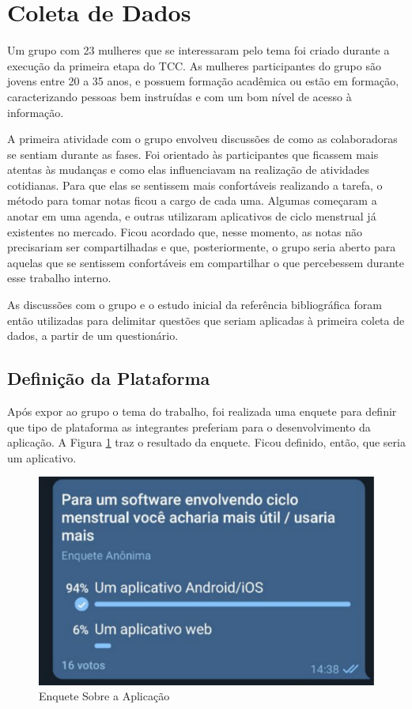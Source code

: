 \section{Coleta de Dados}
\label{coletadados}

Um grupo com 23 mulheres que se interessaram pelo tema foi criado durante a execução da primeira etapa do TCC. 
As mulheres participantes do grupo são jovens entre 20 a 35 anos, e possuem 
formação acadêmica ou estão em formação, caracterizando pessoas bem instruídas e com um bom 
nível de acesso à informação.

A primeira atividade com o grupo envolveu discussões de como as colaboradoras se sentiam durante as fases. Foi orientado
às participantes que ficassem mais atentas às mudanças e como elas influenciavam na realização de 
atividades cotidianas. Para que elas se sentissem mais confortáveis realizando a tarefa, o método para tomar notas ficou a cargo de cada uma. 
Algumas começaram a anotar em uma agenda, e outras utilizaram 
aplicativos de ciclo menstrual já existentes no mercado. Ficou acordado que, 
nesse momento, as notas não precisariam ser compartilhadas e que, posteriormente, o grupo seria aberto para 
aquelas que se sentissem confortáveis em compartilhar o que percebessem 
durante esse trabalho interno.

As discussões com o grupo e o estudo inicial da referência bibliográfica foram então utilizadas para 
delimitar questões que seriam aplicadas à primeira coleta de dados, a partir de um questionário.

\subsection{Definição da Plataforma}

Após expor ao grupo o tema do trabalho, foi realizada uma enquete para definir que tipo de plataforma as 
integrantes preferiam para o desenvolvimento da aplicação. A Figura \ref{fig07} traz o resultado da enquete. 
Ficou definido, então, que seria um aplicativo.

\begin{figure}[htbp]
	\caption{Enquete Sobre a Aplicação}
	\begin{center}
	\includegraphics[keepaspectratio=true,scale=0.3]{figuras/enqueteApp.pdf}
	\end{center}
    \label{fig07}
\end{figure}

